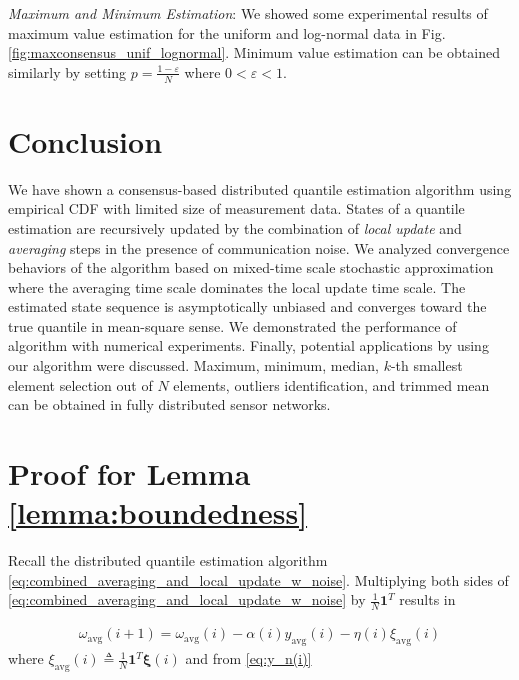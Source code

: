 \documentclass[journal]{IEEEtran}
\begin{document}
\emph{Maximum and Minimum Estimation}: We showed some experimental results of maximum value estimation for the uniform and log-normal data in Fig. \ref{fig:maxconsensus_unif_lognormal}. Minimum value estimation can be obtained similarly by setting $p = \frac{1-\varepsilon}{N}$ where $0 < \varepsilon <1$. 






\vspace{-1mm}
\section{Conclusion} \label{conclusion}
We have shown a consensus-based distributed quantile estimation algorithm using empirical CDF with limited size of measurement data. States of a quantile estimation are recursively updated by the combination of \emph{local update} and \emph{averaging} steps in the presence of communication noise. We analyzed convergence behaviors of the algorithm based on mixed-time scale stochastic approximation where the averaging time scale dominates the local update time scale. The estimated state sequence is asymptotically unbiased and converges toward the true quantile in mean-square sense. We demonstrated the performance of algorithm with numerical experiments. Finally, potential applications by using our algorithm were discussed. Maximum, minimum, median, $k$-th smallest element selection out of $N$ elements, outliers identification, and trimmed mean can be obtained in fully distributed sensor networks.




\appendices
\section{Proof for Lemma \ref{lemma:boundedness}} \label{sec:append_proof_lemma:boundedness}
Recall the distributed quantile estimation algorithm \eqref{eq:combined_averaging_and_local_update_w_noise}. Multiplying both sides of \eqref{eq:combined_averaging_and_local_update_w_noise} by $\frac{1}{N} \mathbf{1}^T$ results in 

\vspace{-4mm}
\small
\begin{align}
\omega_{\text{avg}} (i+1) = \omega_{\text{avg}}(i) - \alpha(i) y_{\text{avg}}(i) - \eta(i) \xi_{\text{avg}}(i)
\end{align}
\normalsize
where $\xi_{\text{avg}}(i) \triangleq \frac{1}{N} \mathbf{1}^T \bm{\xi}(i)$ and from \eqref{eq:y_n(i)} 
\end{document}

